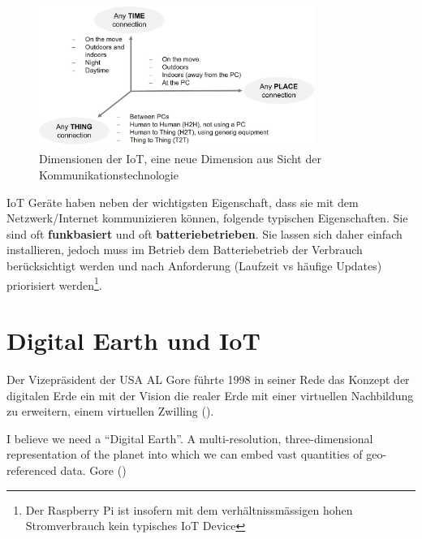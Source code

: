 \documentclass[
  11pt,
  a4paperpaper,
  oneside, openany  ,captions=tableheading
]{scrbook}
\theoremstyle{definition}
\theoremstyle{remark}
\renewenvironment{quote}{\begin{customblockquote}\list{}{\rightmargin=0em\leftmargin=0em}%
\item\relax\color{blockquote-text}\ignorespaces}{\unskip\unskip\endlist\end{customblockquote}}
\begin{document}
\begin{figure}[H]

{\centering \includegraphics[width=0.8\textwidth,height=\textheight]{images/iot_dimension.jpg}

}

\caption{Dimensionen der IoT, eine neue Dimension aus Sicht der
Kommunikationstechnologie}

\end{figure}%

IoT Geräte haben neben der wichtigsten Eigenschaft, dass sie mit dem
Netzwerk/Internet kommunizieren können, folgende typischen
Eigenschaften. Sie sind oft \textbf{funkbasiert} und oft
\textbf{batteriebetrieben}. Sie lassen sich daher einfach installieren,
jedoch muss im Betrieb dem Batteriebetrieb der Verbrauch berücksichtigt
werden und nach Anforderung (Laufzeit vs häufige Updates) priorisiert
werden\footnote{Der Raspberry Pi ist insofern mit dem
  verhältnissmässigen hohen Stromverbrauch kein typisches IoT Device}.

\section{Digital Earth und IoT}\label{digital-earth-und-iot}

Der Vizepräsident der USA AL Gore führte 1998 in seiner Rede das Konzept
der digitalen Erde ein mit der Vision die realer Erde mit einer
virtuellen Nachbildung zu erweitern, einem virtuellen Zwilling
().

\begin{quote}
I believe we need a ``Digital Earth''. A multi-resolution,
three-dimensional representation of the planet into which we can embed
vast quantities of geo-referenced data. Gore
()
\end{quote}
\end{document}
